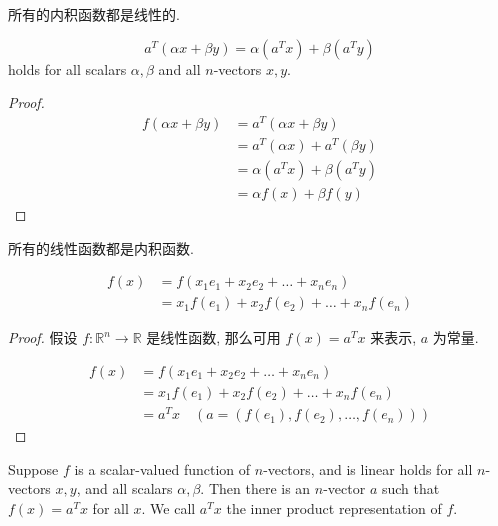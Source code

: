 \begin{theorem}
    所有的内积函数都是线性的.

    $$
a^{T}(\alpha x+\beta y)=\alpha\left(a^{T} x\right)+\beta\left(a^{T} y\right)
$$
holds for all scalars $ \alpha, \beta $ and all $ n $-vectors $ x, y $.
\end{theorem}

\begin{proof}
    $$ \begin{aligned} f(\alpha x+\beta y) &=a^{T}(\alpha x+\beta y) \\ &=a^{T}(\alpha x)+a^{T}(\beta y) \\ &=\alpha\left(a^{T} x\right)+\beta\left(a^{T} y\right) \\ &=\alpha f(x)+\beta f(y) \end{aligned} $$
\end{proof}


\begin{theorem}
    所有的线性函数都是内积函数.

    $$ \begin{aligned} f(x) &=f\left(x_{1} e_{1}+x_{2} e_{2}+\ldots+x_{n} e_{n}\right) \\ &=x_{1} f\left(e_{1}\right)+x_{2} f\left(e_{2}\right)+\ldots+x_{n} f\left(e_{n}\right) \end{aligned} $$
\end{theorem}

\begin{proof}
    假设 $ f: \mathbb{R}^{n} \rightarrow \mathbb{R} $ 是线性函数, 那么可用 $ f(x)=a^{T} x $ 来表示, $ a $ 为常量.

    $$ \begin{aligned} f(x) &=f\left(x_{1} e_{1}+x_{2} e_{2}+\ldots+x_{n} e_{n}\right) \\ &=x_{1} f\left(e_{1}\right)+x_{2} f\left(e_{2}\right)+\ldots+x_{n} f\left(e_{n}\right) \\ & = a^Tx \quad (a = ( f\left(e_{1}\right), f\left(e_{2}\right), \ldots, f\left(e_{n}\right) )) \end{aligned} $$
\end{proof}

\begin{definition}
    Suppose $ f $ is a scalar-valued function of $ n $-vectors, and is linear  holds for all $ n $-vectors $ x, y $, and all scalars $ \alpha, \beta $. Then there is an $ n $-vector $ a $ such that $ f(x)=a^{T} x $ for all $ x $. We call $ a^{T} x $ the inner product representation of $ f $.
\end{definition}

